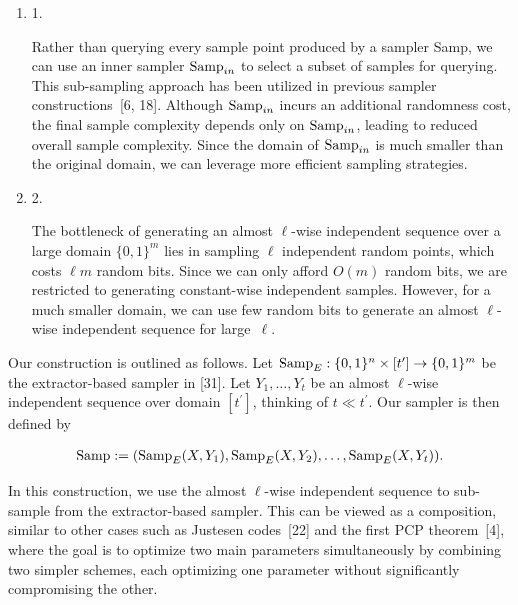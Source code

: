 \documentclass[10pt,a4paper]{article}
\begin{document}
\begin{enumerate}


\item[] 
1. 


Rather than querying every sample point produced by a sampler Samp, we can use an inner sampler $\textup{{Samp}}_{in}$ to select a subset of samples for querying. This sub-sampling approach has been utilized in previous sampler constructions [6, 18]. Although $\textup{{Samp}}_{in}$ incurs an additional randomness cost, the final sample complexity depends only on $\textup{{Samp}}_{in}$, leading to reduced overall sample complexity. Since the domain of $\textup{{Samp}}_{in}$ is much smaller than the original domain, we can leverage more efficient sampling strategies.\par





\item[] 
2. 


The bottleneck of generating an almost $\ell$-wise independent sequence over a large domain $\{0,1\}^{m}$ lies in sampling $\ell$ independent random points, which costs $\ell m$ random bits. Since we can only afford $O(m)$ random bits, we are restricted to generating constant-wise independent samples. However, for a much smaller domain, we can use few random bits to generate an almost $\ell$-wise independent sequence for large $\ell$.\par





\end{enumerate}




Our construction is outlined as follows.
Let $\textup{{Samp}}_{E}:\{0,1\}^{n}\times[t^{\prime}]\to\{0,1\}^{m}$ be the extractor-based sampler in [31].
Let $Y_{1},\dots,Y_{t}$ be an almost $\ell$-wise independent sequence over domain $[t^{\prime}]$, thinking of $t\ll t^{\prime}$. Our sampler is then defined by\par


\[\begin{gathered}
\textup{{Samp}}:=(\textup{{Samp}}_{E}(X,Y_{1}),\textup{{Samp}}_{E}(X,Y_{2}),\dots,\textup{{Samp}}_{E}(X,Y_{t})).
\end{gathered}\]


In this construction, we use the almost $\ell$-wise independent sequence to sub-sample from the extractor-based sampler. This can be viewed as a composition, similar to other cases such as Justesen codes [22] and the first PCP theorem [4], where the goal is to optimize two main parameters simultaneously by combining two simpler schemes, each optimizing one parameter without significantly compromising the other.\par
\end{document}
